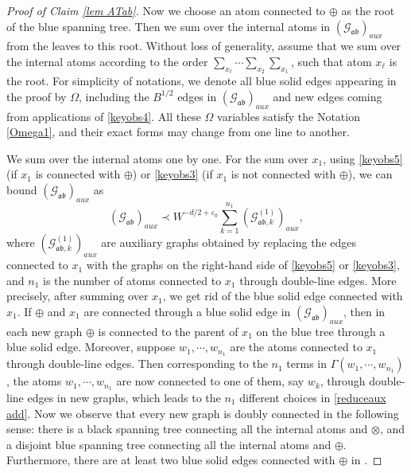 \documentclass{article}
\newcommand{\1}{\mathds{1}}
\numberwithin{equation}{section}
\newcommand{\be}{\begin{equation}}
\newcommand{\ee}{\end{equation}}
\newcommand{\e}{{\varepsilon}}
\newcommand{\fa}{{\mathfrak a}}
\newcommand{\fb}{{\mathfrak b}}
\renewcommand{\cal}{\mathcal}
\theoremstyle{plain} %
\theoremstyle{remark}
\begin{document}
\begin{proof}[Proof of Claim \ref{lem ATab}]
Now we choose an atom connected to $\oplus$ as the root of the blue spanning tree. Then we sum over the internal atoms in $(\cal G_{\fa\fb})_{aux}$ from the leaves to this root. Without loss of generality, assume that we sum over the internal atoms according to the order $\sum_{x_\ell}\cdots \sum_{x_2}\sum_{x_1}$, such that atom $x_\ell$ is the root. For simplicity of notations, we denote all blue solid edges appearing in the proof by $\Omega$, including the $B^{1/2}$ edges in $(\cal G_{\fa\fb})_{aux}$ and new edges coming from applications of \eqref{keyobs4}. All these $\Omega$ variables satisfy the Notation \ref{Omega1}, and their exact forms may change from one line to another.


We sum over the internal atoms one by one. For the sum over $x_1$, using \eqref{keyobs5} (if $x_1$ is connected with $\oplus$) or \eqref{keyobs3} (if  $x_1$ is not connected with $\oplus$), we can bound $ (\cal G_{\fa\fb})_{aux}$ as
\be\label{reduceaux add}
(\cal G_{\fa\fb})_{aux} \prec W^{-d/2+\e_0}\sum_{k=1}^{n_1} (\cal G^{(1)}_{\fa\fb,k})_{aux},\ee
where $(\cal G^{(1)}_{\fa\fb, k})_{aux}$ are auxiliary graphs obtained by replacing the edges connected to $x_1$ with the graphs on the right-hand side of \eqref{keyobs5} or \eqref{keyobs3}, and $n_1$ is the number of atoms connected to $x_1$ through double-line edges. More precisely, after summing over $x_1$, we get rid of the blue solid edge connected with $x_1$. If $\oplus$ and $x_1$ are connected through a blue solid edge in $(\cal G_{\fa\fb})_{aux} $, then in each new graph $\oplus$ is connected to the parent of $x_1$ on the blue tree through a blue solid edge. Moreover, suppose $w_{1},\cdots,w_{n_1}$ are the atoms connected to $x_1$ through double-line edges. Then corresponding to the $n_1$ terms in $\Gamma(w_{1},\cdots, w_{n_1})$, the atoms $w_{1},\cdots,w_{n_1}$ are now connected to one of them, say $w_{k}$, through double-line edges in new graphs, which leads to the $n_1$ different choices in \eqref{reduceaux add}.
Now we observe that every new graph \smash{$(\cal G^{(1)}_{\fa\fb,k})_{aux}$} is doubly connected in the following sense: there is a black spanning tree connecting all the internal atoms and $\otimes$, and a disjoint blue spanning tree connecting all the internal atoms and $\oplus$. Furthermore, there are at least two blue solid edges connected with $\oplus$ in \smash{$(\cal G^{(1)}_{\fa\fb,k})_{aux}$}.


\end{proof}
\end{document}

